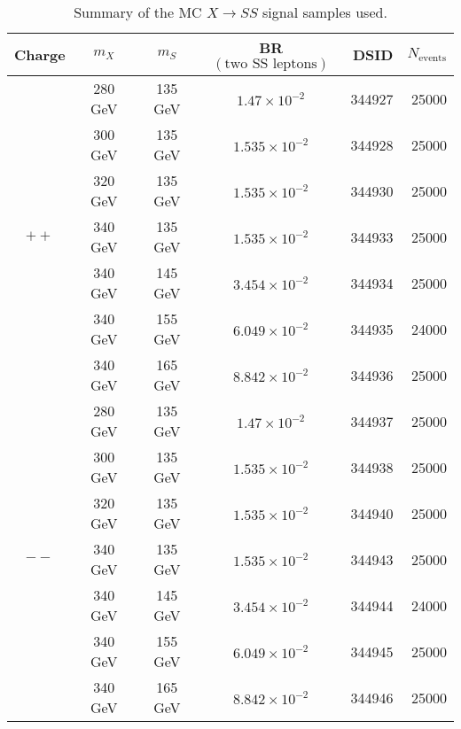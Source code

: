 \begin{table}[!htbp]
  \centering
  \begin{tabular}{c c c c r r}
    \hline
    \hline
    Charge & $m_X$ & $m_S$ & BR$(\text{two SS leptons})$ & DSID & $N_{\text{events}}$ \\
    \hline
    \multirow{7}{*}{$++$} & 280 GeV & 135 GeV & $1.47\times10^{-2}$ &344927  & 25000 \\
     & 300 GeV & 135 GeV & $1.535\times10^{-2}$ &344928  & 25000 \\
     & 320 GeV & 135 GeV & $1.535\times10^{-2}$ &344930  & 25000 \\
     & 340 GeV & 135 GeV & $1.535\times10^{-2}$ &344933  & 25000 \\
     & 340 GeV & 145 GeV & $3.454\times10^{-2}$ &344934  & 25000 \\
     & 340 GeV & 155 GeV & $6.049\times10^{-2}$ &344935  & 24000 \\
     & 340 GeV & 165 GeV & $8.842\times10^{-2}$ &344936  & 25000 \\
    \hline
    \multirow{7}{*}{$--$} & 280 GeV & 135 GeV & $1.47\times10^{-2}$ &344937  & 25000 \\
     & 300 GeV & 135 GeV & $1.535\times10^{-2}$ &344938  & 25000 \\
     & 320 GeV & 135 GeV & $1.535\times10^{-2}$ &344940  & 25000 \\
     & 340 GeV & 135 GeV & $1.535\times10^{-2}$ &344943  & 25000 \\
     & 340 GeV & 145 GeV & $3.454\times10^{-2}$ &344944  & 24000 \\
     & 340 GeV & 155 GeV & $6.049\times10^{-2}$ &344945  & 25000 \\
     & 340 GeV & 165 GeV & $8.842\times10^{-2}$ &344946  & 25000 \\
    \hline
    \hline
  \end{tabular}
  \caption{Summary of the MC $X\rightarrow SS$ signal samples used.}
  \label{tab:dsid_SS}
\end{table}
